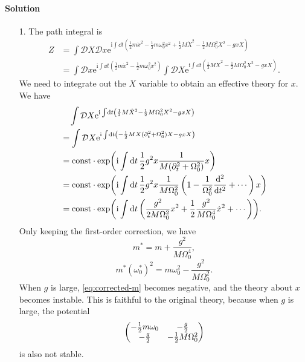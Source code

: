 \documentclass[hyperref, a4paper]{article}
\newcommand*{\ii}{\mathrm{i}}
\newcommand*{\ee}{\mathrm{e}}
\newcommand*{\const}{\mathrm{const}}
\newcommand*{\fd}[1]{\mathcal{D} #1}
\begin{document}
\paragraph{Solution} \begin{itemize}
\item[1.] The path integral is 
\begin{equation}
    \begin{aligned}
        Z &= \int \fd{X} \fd{x} \ee^{\ii \int \dd{t} \left(
            \frac{1}{2} m \dot{x}^2-\frac{1}{2} m \omega_0^2 x^2
            +\frac{1}{2} M \dot{X}^2-\frac{1}{2} M \Omega_0^2 X^2-g x X
        \right)} \\
        &= \int \fd{x} \ee^{\ii \int \dd{t} \left( \frac{1}{2} m \dot{x}^2-\frac{1}{2} m \omega_0^2 x^2 \right)}
        \int \fd{X} \ee^{\ii \int \dd{t} \left(
            \frac{1}{2} M \dot{X}^2-\frac{1}{2} M \Omega_0^2 X^2-g x X
        \right)} .
    \end{aligned}
    \label{eq:integrate-x-big-x}
\end{equation}
We need to integrate out the $X$ variable to obtain an effective theory for $x$.
We have 
\[
    \begin{aligned}
        &\quad \int \fd{X} \ee^{\ii \int \dd{t} \left(
            \frac{1}{2} M \dot{X}^2-\frac{1}{2} M \Omega_0^2 X^2-g x X
        \right)} \\
        &= \int \fd{X} \ee^{\ii \int \dd{t} \left(
            - \frac{1}{2} M X (\partial_t^2 + \Omega_0^2) X -g x X
        \right)}  \\
        &= \const \cdot \exp(\ii \int \dd{t} \frac{1}{2} g^2 x \frac{1}{M (\partial_t^2 + \Omega_0^2)} x) \\
        &= \const \cdot \exp(\ii \int \dd{t} \frac{1}{2} g^2 x \frac{1}{M \Omega_0^2} 
        \left( 1 - \frac{1}{\Omega_0^2} \dv[2]{t} + \cdots \right) x) \\
        &= \const \cdot \exp(\ii \int \dd{t} \left(
            \frac{g^2}{2 M \Omega_0^2} x^2 
            + \frac{1}{2} \frac{g^2}{M \Omega_0^4} \dot{x}^2 + \cdots
        \right)) .
    \end{aligned}
\]
Only keeping the first-order correction, we have 
\begin{equation}
    m^* = m + \frac{g^2}{M \Omega_0^4},
\end{equation}
\begin{equation}
    m^* (\omega_0^*)^2 = m \omega_0^2 - \frac{g^2}{M \Omega_0^2}.
    \label{eq:corrected-m}
\end{equation}
When $g$ is large, \eqref{eq:corrected-m} becomes negative,
and the theory about $x$ becomes instable.
This is faithful to the original theory,
because when $g$ is large,
the potential 
\[
    \pmqty{ - \frac{1}{2} m \omega_0 & - \frac{g}{2} \\ - \frac{g}{2} & - \frac{1}{2} M \Omega_0^2 }
\]
is also not stable.


\end{itemize}
\end{document}
